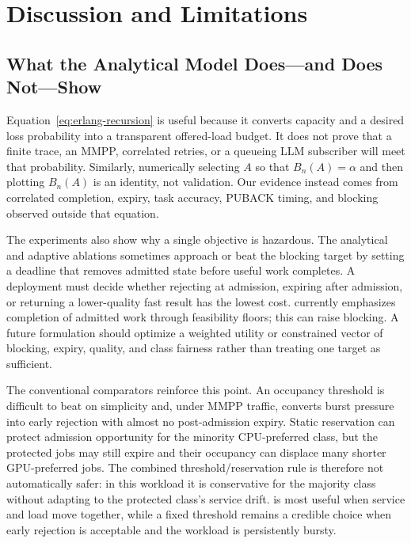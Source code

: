 \section{Discussion and Limitations}
\label{sec:discussion}

\subsection{What the Analytical Model Does---and Does Not---Show}

Equation~\eqref{eq:erlang-recursion} is useful because it converts capacity and a desired loss probability into a transparent offered-load budget. It does not prove that a finite trace, an MMPP, correlated retries, or a queueing LLM subscriber will meet that probability. Similarly, numerically selecting $A$ so that $B_n(A)=\alpha$ and then plotting $B_n(A)$ is an identity, not validation. Our evidence instead comes from correlated completion, expiry, task accuracy, PUBACK timing, and blocking observed outside that equation.

The experiments also show why a single objective is hazardous. The analytical and adaptive ablations sometimes approach or beat the blocking target by setting a deadline that removes admitted state before useful work completes. A deployment must decide whether rejecting at admission, expiring after admission, or returning a lower-quality fast result has the lowest cost. \method{} currently emphasizes completion of admitted work through feasibility floors; this can raise blocking. A future formulation should optimize a weighted utility or constrained vector of blocking, expiry, quality, and class fairness rather than treating one target as sufficient.

The conventional comparators reinforce this point. An occupancy threshold is difficult to beat on simplicity and, under MMPP traffic, converts burst pressure into early rejection with almost no post-admission expiry. Static reservation can protect admission opportunity for the minority CPU-preferred class, but the protected jobs may still expire and their occupancy can displace many shorter GPU-preferred jobs. The combined threshold/reservation rule is therefore not automatically safer: in this workload it is conservative for the majority class without adapting to the protected class's service drift. \method{} is most useful when service and load move together, while a fixed threshold remains a credible choice when early rejection is acceptable and the workload is persistently bursty.


